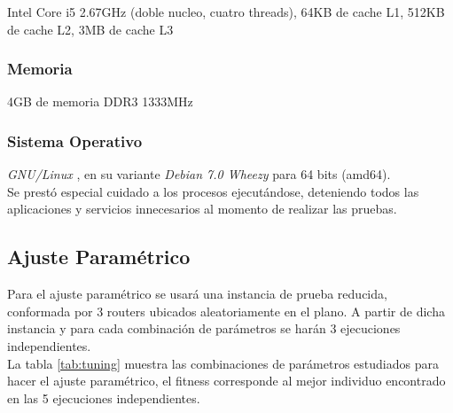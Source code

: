 \documentclass[journal]{IEEEtran}
\begin{document}
Intel Core i5 2.67GHz (doble nucleo, cuatro threads), 64KB de cache L1, 512KB de cache L2, 3MB de cache L3\\

\subsubsection{Memoria}

4GB de memoria DDR3 1333MHz\\

\subsubsection{Sistema Operativo}

\emph{GNU/Linux} \cite{gnu} \cite{linux}, en su variante \emph{Debian 7.0 Wheezy} \cite{debian:stable} para 64 bits (amd64).\\

Se prestó especial cuidado a los procesos ejecutándose, deteniendo todos las aplicaciones y servicios innecesarios al momento de realizar las pruebas.

\subsection{Ajuste Paramétrico}

Para el ajuste paramétrico se usará una instancia de prueba reducida, conformada por 3 routers ubicados aleatoriamente en el plano. A partir de dicha instancia y para cada combinación de parámetros se harán 3 ejecuciones independientes.\\

La tabla \ref{tab:tuning} muestra las combinaciones de parámetros estudiados para hacer el ajuste paramétrico, el fitness corresponde al mejor individuo encontrado en las 5 ejecuciones independientes.
\end{document}
